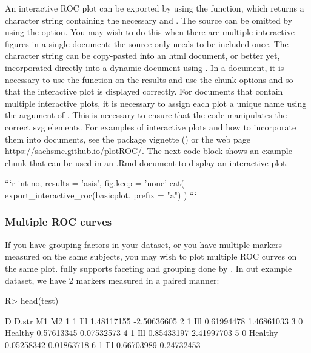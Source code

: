 \documentclass[codesnippet]{jss}
\begin{document}
An interactive ROC plot can be exported by using the
 function, which returns a character string
containing the necessary  and . The
 source can be omitted by using the
 option. You may wish to do this when there are
multiple interactive figures in a single document; the source only needs
to be included once. The character string can be copy-pasted into an
html document, or better yet, incorporated directly into a dynamic
document using  \citep{knitr}. In a  document, it
is necessary to use the  function on the results and use the
chunk options  and  so
that the interactive plot is displayed correctly. For documents that
contain multiple interactive plots, it is necessary to assign each plot
a unique name using the  argument of
. This is necessary to ensure that the
 code manipulates the correct svg elements. For
examples of interactive plots and how to incorporate them into
 documents, see the package vignette
() or the web page
https://sachsmc.github.io/plotROC/. The next code block shows an example
 chunk that can be used in an .Rmd document to display an
interactive plot.

\begin{Code}
```{r int-no, results = 'asis', fig.keep = 'none'}
cat(
  export_interactive_roc(basicplot, 
                        prefix = "a")
  )
```
\end{Code}

\subsubsection{Multiple ROC curves}\label{multiple-roc-curves}

If you have grouping factors in your dataset, or you have multiple
markers measured on the same subjects, you may wish to plot multiple ROC
curves on the same plot.  fully supports faceting and
grouping done by . In out example dataset, we have 2
markers measured in a paired manner:

\begin{Schunk}
\begin{Sinput}
R> head(test)
\end{Sinput}
\begin{Soutput}
  D   D.str         M1          M2
1 1     Ill 1.48117155 -2.50636605
2 1     Ill 0.61994478  1.46861033
3 0 Healthy 0.57613345  0.07532573
4 1     Ill 0.85433197  2.41997703
5 0 Healthy 0.05258342  0.01863718
6 1     Ill 0.66703989  0.24732453
\end{Soutput}
\end{Schunk}
\end{document}

